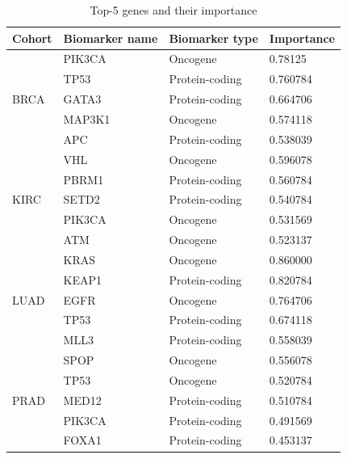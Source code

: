 \begin{table}
    \caption{Top-5 genes and their importance}
    \label{table:proteinimportance_1} %
    \begin{center}
    \scriptsize{
    \vspace{-6mm}
    \begin{tabular}{l|l|l|l}
        \toprule
        \textbf{Cohort} & \textbf{Biomarker name} & \textbf{Biomarker type} & \textbf{Importance} \\ 
        \midrule
        \multirow{5}{*}{BRCA} & PIK3CA & Oncogene & 0.78125 \\ %
        & TP53 & Protein-coding & 0.760784 \\ %
        & GATA3  & Protein-coding & 0.664706 \\ %
        & MAP3K1  & Oncogene & 0.574118 \\ %
        & APC   & Protein-coding & 0.538039 \\ 
        \midrule
        \multirow{5}{*}{KIRC} & VHL & Oncogene & 0.596078 \\ %
        & PBRM1 & Protein-coding  & 0.560784 \\ %
        & SETD2 & Protein-coding & 0.540784 \\ %
        & PIK3CA & Oncogene & 0.531569 \\ %
        & ATM & Oncogene & 0.523137 \\ %
        \midrule
        \multirow{5}{*}{LUAD} & KRAS & Oncogene & 0.860000 \\ %
        & KEAP1 & Protein-coding & 0.820784 \\ %
        & EGFR & Oncogene & 0.764706 \\ %
        & TP53 & Protein-coding & 0.674118 \\ %
        & MLL3 & Protein-coding & 0.558039 \\ %
        \midrule
        \multirow{5}{*}{PRAD}& SPOP & Oncogene & 0.556078 \\ %
        & TP53 & Oncogene & 0.520784 \\ %
        & MED12 & Protein-coding & 0.510784 \\ %
        & PIK3CA & Protein-coding & 0.491569 \\ %
        & FOXA1 & Protein-coding & 0.453137 \\ %

\end{tabular}}
\end{center}
\end{table}
